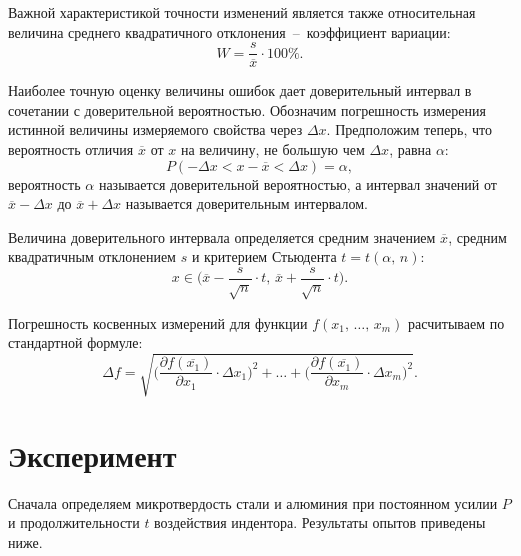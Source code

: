 \documentclass[12pt, a4paper]{article}
\begin{document}
    Важной характеристикой точности изменений является также относительная величина среднего квадратичного отклонения~--~коэффициент вариации:
    \begin{equation}
        W = \frac{s}{\overline{x}} \cdot 100\%.
        \label{eq7}
    \end{equation}
    
    Наиболее точную оценку величины ошибок дает доверительный интервал в сочетании с доверительной вероятностью. Обозначим погрешность измерения истинной величины измеряемого свойства через $\Delta x$. Предположим теперь, что вероятность отличия $\overline{x}$ от $x$ на величину, не большую чем $\Delta x$, равна $\alpha$:
    \begin{equation}
        P(-\Delta x < x - \overline{x} < \Delta x) = \alpha,
        \label{eq8}
    \end{equation}
    вероятность $\alpha$ называется доверительной вероятностью, а интервал значений от $\overline{x} - \Delta x$ до $\overline{x} + \Delta x$ называется доверительным интервалом.
    
    Величина доверительного интервала определяется средним значением $\overline{x}$, средним квадратичным отклонением $s$ и критерием Стьюдента $t = t(\alpha, \, n)$:
    \begin{equation}
        x \in \bigg (\overline{x} - \frac{s}{\sqrt{n}} \cdot t, \, \overline{x} + \frac{s}{\sqrt{n}} \cdot t \bigg ).
        \label{eq9}
    \end{equation}
    
    Погрешность косвенных измерений для функции $f(x_{1}, \, \ldots, \, x_{m})$ расчитываем по стандартной формуле:
    \begin{equation}
        \Delta f = \sqrt{\Bigg( \frac{\partial f(\overline{x_{1}})}{\partial x_{1}} \cdot \Delta x_{1}\Bigg )^{2} + \ldots + \Bigg( \frac{\partial f(\overline{x_{1}})}{\partial x_{m}} \cdot \Delta x_{m}\Bigg )^{2}}.
        \label{eq10}
    \end{equation}
    
    \newpage
    
    \section{Эксперимент}
    
    Сначала определяем микротвердость стали и алюминия при постоянном усилии $P$ и продолжительности $t$ воздействия индентора. Результаты опытов приведены ниже.
    
\end{document}
